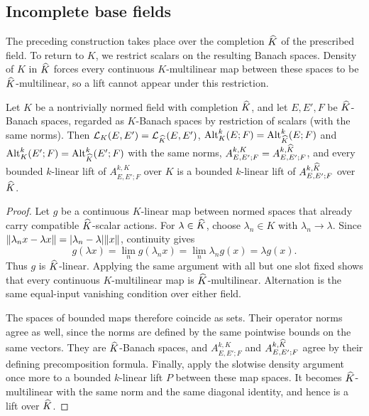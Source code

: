 \subsection{Incomplete base fields}
The preceding construction takes place over the completion $\widehat K$ of the prescribed field. To return to $K$,
we restrict scalars on the resulting Banach spaces. Density of $K$ in $\widehat K$ forces every continuous
$K$\nobreakdash-multilinear map between these spaces to be $\widehat K$\nobreakdash-multilinear, so a lift cannot appear under
this restriction.

\begin{lemma}\label{lem:descent}
Let $K$ be a nontrivially normed field with completion $\widehat K$, and let $E,E',F$ be $\widehat K$\nobreakdash-Banach spaces, regarded as
$K$\nobreakdash-Banach spaces by restriction of scalars (with the same norms). Then $\mathcal L_K(E,E')=\mathcal L_{\widehat K}(E,E')$,
$\operatorname{Alt}^k_K(E;F)=\operatorname{Alt}^k_{\widehat K}(E;F)$ and $\operatorname{Alt}^k_K(E';F)=\operatorname{Alt}^k_{\widehat K}(E';F)$ with the same norms, $A^{k,K}_{E,E';F}=A^{k,\widehat K}_{E,E';F}$,
and every bounded $k$\nobreakdash-linear lift of $A^{k,K}_{E,E';F}$ over $K$ is a bounded $k$\nobreakdash-linear lift of $A^{k,\widehat K}_{E,E';F}$ over
$\widehat K$.
\end{lemma}

\begin{proof}
Let $g$ be a continuous $K$\nobreakdash-linear map between normed spaces that already carry compatible
$\widehat K$\nobreakdash-scalar actions. For $\lambda\in\widehat K$, choose $\lambda_n\in K$ with $\lambda_n\to\lambda$.
Since $\lVert \lambda_nx-\lambda x\rVert=\lvert \lambda_n-\lambda\rvert\lVert x\rVert$, continuity gives
\[
g(\lambda x)=\lim_n g(\lambda_nx)=\lim_n\lambda_ng(x)=\lambda g(x).
\]
Thus $g$ is $\widehat K$\nobreakdash-linear. Applying the same argument with all but one slot fixed shows that every
continuous $K$\nobreakdash-multilinear map is $\widehat K$\nobreakdash-multilinear. Alternation is the same equal-input
vanishing condition over either field.

The spaces of bounded maps therefore coincide as sets. Their operator norms agree as well, since the norms are
defined by the same pointwise bounds on the same vectors. They are $\widehat K$\nobreakdash-Banach spaces, and
$A^{k,K}_{E,E';F}$ and $A^{k,\widehat K}_{E,E';F}$ agree by their defining precomposition formula.
Finally, apply the slotwise density argument once more to a bounded $k$\nobreakdash-linear lift $P$ between these
map spaces. It becomes $\widehat K$\nobreakdash-multilinear with the same norm and the same diagonal identity, and hence
is a lift over $\widehat K$.
\end{proof}


